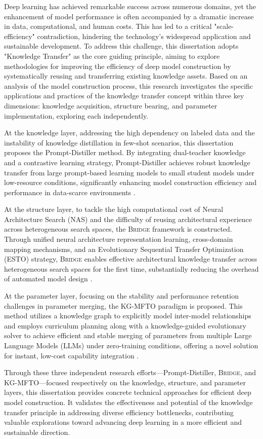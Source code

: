 \begin{eabstract}	%
	Deep learning has achieved remarkable success across numerous domains, yet the enhancement of model performance is often accompanied by a dramatic increase in data, computational, and human costs. This has led to a critical "scale-efficiency" contradiction, hindering the technology's widespread application and sustainable development. To address this challenge, this dissertation adopts "Knowledge Transfer" as the core guiding principle, aiming to explore methodologies for improving the efficiency of deep model construction by systematically reusing and transferring existing knowledge assets. Based on an analysis of the model construction process, this research investigates the specific applications and practices of the knowledge transfer concept within three key dimensions: knowledge acquisition, structure bearing, and parameter implementation, exploring each independently.

	At the knowledge layer, addressing the high dependency on labeled data and the instability of knowledge distillation in few-shot scenarios, this dissertation proposes the Prompt-Distiller method. By integrating dual-teacher knowledge and a contrastive learning strategy, Prompt-Distiller achieves robust knowledge transfer from large prompt-based learning models to small student models under low-resource conditions, significantly enhancing model construction efficiency and performance in data-scarce environments .

	At the structure layer, to tackle the high computational cost of Neural Architecture Search (NAS) and the difficulty of reusing architectural experience across heterogeneous search spaces, the \textsc{Bridge} framework is constructed. Through unified neural architecture representation learning, cross-domain mapping mechanisms, and an Evolutionary Sequential Transfer Optimization (ESTO) strategy, \textsc{Bridge} enables effective architectural knowledge transfer across heterogeneous search spaces for the first time, substantially reducing the overhead of automated model design .

	At the parameter layer, focusing on the stability and performance retention challenges in parameter merging, the KG-MFTO paradigm is proposed. This method utilizes a knowledge graph to explicitly model inter-model relationships and employs curriculum planning along with a knowledge-guided evolutionary solver to achieve efficient and stable merging of parameters from multiple Large Language Models (LLMs) under zero-training conditions, offering a novel solution for instant, low-cost capability integration .

	Through these three independent research efforts—Prompt-Distiller, \textsc{Bridge}, and KG-MFTO—focused respectively on the knowledge, structure, and parameter layers, this dissertation provides concrete technical approaches for efficient deep model construction. It validates the effectiveness and potential of the knowledge transfer principle in addressing diverse efficiency bottlenecks, contributing valuable explorations toward advancing deep learning in a more efficient and sustainable direction.
\end{eabstract}

